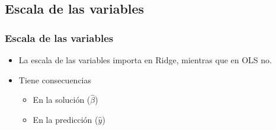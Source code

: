 \documentclass[
  shownotes,
  xcolor={svgnames},
  hyperref={colorlinks,citecolor=DarkBlue,linkcolor=andesred,urlcolor=DarkBlue}
  , aspectratio=169]{beamer}
\begin{document}
\subsection{Escala de las variables}
\begin{frame}[fragile]
\frametitle{Escala de las variables}

\begin{itemize}
\item La escala de las variables importa en Ridge, mientras que en OLS no.
\medskip
\item Tiene consecuencias 
\begin{itemize}
    \medskip
    \item En  la solución ($\hat{\beta}$)
    \medskip
    \item En la predicción ($\hat{y}$)
\end{itemize}
\end{itemize}

\end{frame}
\end{document}
